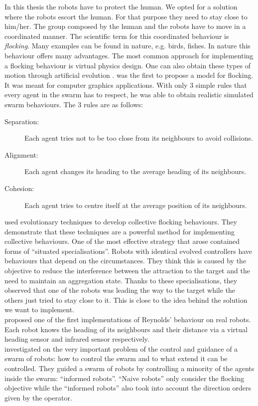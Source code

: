 \documentclass[oneside, a4paper, 12pt]{memoir}
\begin{document}
		In this thesis the robots have to protect the human. We opted for a solution where the robots escort the human. For that purpose they need to stay close to him/her. The group composed by the human and the robots have to move in a coordinated manner. The scientific term for this coordinated behaviour is \emph{flocking}. Many examples can be found in nature, e.g. birds, fishes. In nature this behaviour offers many advantages. The most common approach for implementing a flocking behaviour is virtual physics design. One can also obtain these types of motion through artificial evolution \citep{brambilla2013swarm}. \citet{reynolds1987flocks} was the first to propose a model for flocking. It was meant for computer graphics applications. With only 3 simple rules that every agent in the swarm has to respect, he was able to obtain realistic simulated swarm behaviours. The 3 rules are as follows:
		\begin{description}
			\item[Separation:] Each agent tries not to be too close from its neighbours to avoid collisions.
			\item[Alignment:] Each agent changes its heading to the average heading of its neighbours.
			\item[Cohesion:] Each agent tries to centre itself at the average position of its neighbours.
		\end{description}
		\citet{baldassarre2003evolving} used evolutionary techniques to develop collective flocking behaviours. They demonstrate that these techniques are a powerful method for implementing collective behaviours. One of the most effective strategy that arose contained forms of \enquote{situated specialisations}. Robots with identical evolved controllers have behaviours that depend on the circumstances. They think this is caused by the objective to reduce the interference between the attraction to the target and the need to maintain an aggregation state. Thanks to these specialisations, they observed that one of the robots was leading the way to the target while the others just tried to stay close to it. This is close to the idea behind the solution we want to implement.\\
		\citet{turgut2008self} proposed one of the first implementations of Reynolds' \citep{reynolds1987flocks} behaviour on real robots. Each robot knows the heading of its neighbours and their distance via a virtual heading sensor and infrared sensor respectively.\\
		\citet{ccelikkanat2010steering} investigated on the very important problem of the control and guidance of a swarm of robots: how to control the swarm and to what extend it can be controlled. They guided a swarm of robots by controlling a minority of the agents inside the swarm: \enquote{informed robots}. \enquote{Naive robots} only consider the flocking objective while the \enquote{informed robots} also took into account the direction orders given by the operator.\\
\end{document}

